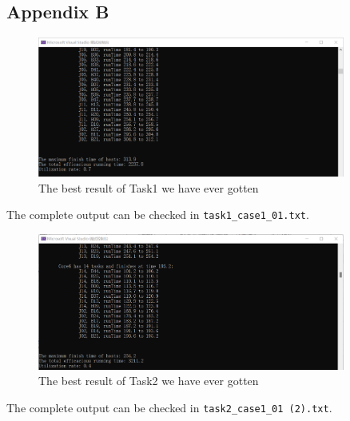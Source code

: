 \documentclass{llncs}
\begin{document}
\begin{appendices}
		\section*{Appendix B}
		\begin{figure}[H]
			\begin{center}
				\includegraphics[width=0.9\textwidth]{Fig-task1-res-new.png}
				\caption{The best result of Task1 we have ever gotten}
				\label{Fig-task1-best}
			\end{center}
		\end{figure}
		The complete output can be checked in \texttt{task1\_case1\_01.txt}. 
	
		\begin{figure}[H]
			\begin{center}
				\includegraphics[width=0.9\textwidth]{Fig-task2-res-new.png}
				\caption{The best result of Task2 we have ever gotten}
				\label{Fig-task2-res-new}
			\end{center}
		\end{figure}
		The complete output can be checked in \texttt{task2\_case1\_01 (2).txt}. 
		
	\end{appendices}
	
		
	
\end{document}
